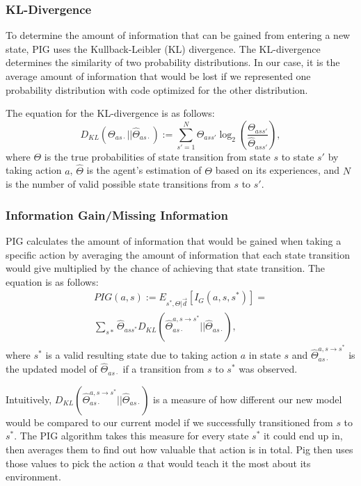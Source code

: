 \documentclass[letterpaper]{article} %
\begin{document}
\subsubsection{KL-Divergence}
To determine the amount of information that can be gained from entering a new state, PIG uses the Kullback-Leibler (KL) divergence. The KL-divergence determines the similarity of two probability distributions. In our case, it is the average amount of information that would be lost if we represented one probability distribution with code optimized for the other distribution.

The equation for the KL-divergence is as follows:
\[D_{KL} (\Theta_{as\cdot} || \hat{\Theta}_{as\cdot}) := \sum_{s' = 1}^{ N} \Theta_{ass'} \log_{2}\left(\frac{\Theta_{ass'}}{\hat{\Theta}_{ass'}}\right), \]
where $\Theta$ is the true probabilities of state transition from state $s$ to state $s'$ by taking action $a$, $\hat{\Theta}$ is the agent's estimation of $\Theta$ based on its experiences, and $N$ is the number of valid possible state transitions from $s$ to $s'$.

\subsubsection{Information Gain/Missing Information}
PIG calculates the amount of information that would be gained when taking a specific action by averaging the amount of information that each state transition would give multiplied by the chance of achieving that state transition. The equation is as follows:
\begin{multline}
  PIG(a,s) := E_{s^{*},\Theta|\vec{d}} \left[I_{G}(a,s,s^{*})\right] =\\ \sum_{s*} \hat{\Theta}_{ass^{*}}D_{KL}(\hat{\Theta}_{as\cdot}^{a,s \rightarrow s^{*}} || \hat{\Theta}_{as\cdot}),
  \end{multline}
where $s^{*}$ is a valid resulting state due to taking action $a$ in state $s$ and $\hat{\Theta}_{as\cdot}^{a,s \rightarrow s^{*}}$ is the updated model of $\hat{\Theta}_{as\cdot}$ if a transition from $s$ to $s^{*}$ was observed.

Intuitively, $D_{KL}(\hat{\Theta}_{as\cdot}^{a,s \rightarrow s^{*}} || \hat{\Theta}_{as\cdot})$ is a measure of how different our new model would be compared to our current model if we successfully transitioned from $s$ to $s^{*}$. The PIG algorithm takes this measure for every state $s^{*}$ it could end up in, then averages them to find out how valuable that action is in total. Pig then uses those values to pick the action $a$ that would teach it the most about its environment.
\end{document}
